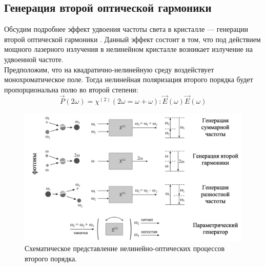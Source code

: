 \subsection*{Генерация второй оптической гармоники} 
\hspace{2mm}
Обсудим подробнее эффект удвоения частоты света в кристалле — генерации второй оптической гармоники \cite{achmanov2}. Данный эффект состоит в том, что под действием мощного лазерного излучения в нелинейном кристалле возникает излучение на удвоенной частоте.
\\
\hspace{2mm}
Предположим, что на квадратично-нелинейную среду воздействует монохроматическое поле. Тогда нелинейная поляризация второго порядка будет пропорциональна полю во второй степени:
\begin{equation}\label{thg1}
\vec{P}(2\omega) = \chi^{(2)}(2\omega = \omega + \omega):\vec{E}(\omega)\vec{E} (\omega)
\end{equation}

\begin{figure}[h]
	\centering
	\includegraphics[width=0.7\linewidth]{images/shg.png}
	\caption{Схематическое представление нелинейно-оптических процессов второго порядка.}
	\label{sghPictr}
\end{figure}


